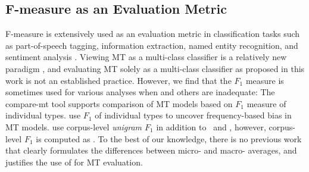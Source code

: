 \subsection{F-measure as an Evaluation Metric}
F-measure \cite{Rijsbergen-1979-F-meas, chinchor-1992-F-meas} is extensively used as an evaluation metric in classification tasks such as part-of-speech tagging, information extraction, named entity recognition, and sentiment analysis \cite{derczynski-2016-f-score}.
Viewing MT as a multi-class classifier is a relatively new paradigm \cite{gowda2020finding}, and evaluating MT solely as a multi-class classifier as proposed in this work is not an established practice.
However, we find that the $F_1$ measure is sometimes used for various analyses when \bleu{} and others are inadequate: The compare-mt tool \citep{neubig-etal-2019-compareMT} supports comparison of MT models based on $F_1$ measure of individual types.
\citet{gowda2020finding} use $F_1$ of individual types to uncover frequency-based bias in MT models.
\citet{sennrich-etal-2016-bpe} use corpus-level \textit{unigram $F_1$} in addition to \bleu\ and \chrf{}, however, corpus-level $F_1$ is computed as . %
To the best of our knowledge, there is no previous work that clearly formulates the differences between micro- and macro- averages, and justifies the use of  for MT evaluation. 